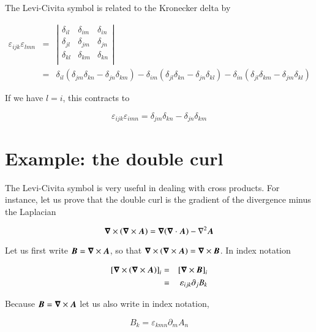 The Levi-Civita symbol is related to the Kronecker delta by 

\begin{eqnarray}
\varepsilon_{ijk}\varepsilon_{lmn}  &=& \left\vert\begin{array}{ccc}
\delta_{il}&\delta_{im}&\delta_{in}\\
\delta_{jl}&\delta_{jm}&\delta_{jn}\\
\delta_{kl}&\delta_{km}&\delta_{kn}\\
\end{array}
\right\vert\\
&=&\delta_{il}\left(\delta_{jm}\delta_{kn}-\delta_{jn}\delta_{km}\right) -   \delta_{im}\left(\delta_{jl}\delta_{kn}-\delta_{jn}\delta_{kl}\right)-
\delta_{in}\left(\delta_{jl}\delta_{km}-\delta_{jm}\delta_{kl}\right) \nonumber
\end{eqnarray}


\noindent If we have $l=i$, this contracts to 

\begin{equation}
\varepsilon_{ijk}\varepsilon_{imn}  = \delta_{jm}\delta_{kn}-\delta_{jn}\delta_{km}
\end{equation}


\section{Example: the double curl}

The Levi-Civita symbol is very useful in dealing with cross products. For instance, let us prove that the double curl is the gradient of the divergence minus the Laplacian

\begin{equation}
{\boldsymbol{\nabla}}\times{\left({\boldsymbol{\nabla}}\times{{\boldsymbol{A}}}\right)} = {\boldsymbol{\nabla}}{\left({\boldsymbol{\nabla}}\cdot{{\boldsymbol{A}}}\right)} - \nabla^2{\boldsymbol{A}}
\label{eq:curlcurl}
\end{equation}


\noindent Let us first write ${\boldsymbol{B}}={\boldsymbol{\nabla}}\times{{\boldsymbol{A}}}$, so that
${\boldsymbol{\nabla}}\times{\left({\boldsymbol{\nabla}}\times{{\boldsymbol{A}}}\right)} = {\boldsymbol{\nabla}}\times{{\boldsymbol{B}}}$. In index notation 

\begin{eqnarray}
\left[{\boldsymbol{\nabla}}\times{\left({\boldsymbol{\nabla}}\times{{\boldsymbol{A}}}\right)}\right]_i&=&\left[{\boldsymbol{\nabla}}\times{{\boldsymbol{B}}}\right]_i\\
&=&\varepsilon_{ijk}\partial_j B_k
\end{eqnarray}

\noindent Because ${\boldsymbol{B}}={\boldsymbol{\nabla}}\times{{\boldsymbol{A}}}$ let us also write in index notation, 

\begin{equation}
B_k =\varepsilon_{kmn}\partial_m A_n
\end{equation}

